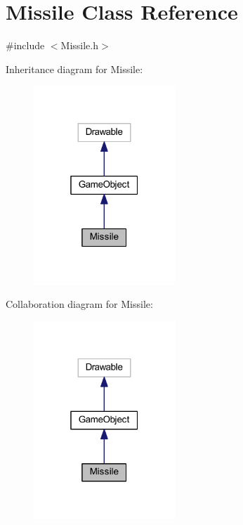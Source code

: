 \hypertarget{class_missile}{}\section{Missile Class Reference}
\label{class_missile}


{\ttfamily \#include $<$Missile.\+h$>$}



Inheritance diagram for Missile\+:\nopagebreak
\begin{figure}[H]
\begin{center}
\leavevmode
\includegraphics[width=151pt]{class_missile__inherit__graph}
\end{center}
\end{figure}


Collaboration diagram for Missile\+:\nopagebreak
\begin{figure}[H]
\begin{center}
\leavevmode
\includegraphics[width=151pt]{class_missile__coll__graph}
\end{center}
\end{figure}
